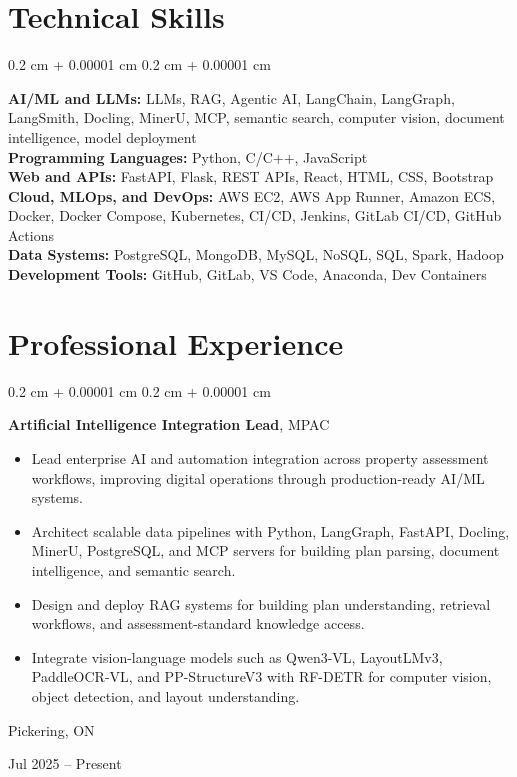 \documentclass[10pt, letterpaper]{article}
\newenvironment{highlights}{
    \begin{itemize}[
        topsep=0.10 cm,
        parsep=0.10 cm,
        partopsep=0pt,
        itemsep=0pt,
        leftmargin=0.4 cm + 10pt
    ]
}{
    \end{itemize}
} %
\newenvironment{onecolentry}{
    \begin{adjustwidth}{
        0.2 cm + 0.00001 cm
    }{
        0.2 cm + 0.00001 cm
    }
}{
    \end{adjustwidth}
} %
\newenvironment{twocolentry}[2][]{
    \onecolentry
    \def\secondColumn{#2}
    \begin{minipage}[t]{\dimexpr\linewidth-4.7cm\relax}
}{
    \end{minipage}\hfill%
    \begin{minipage}[t]{4.5cm}
        \raggedleft\secondColumn
    \end{minipage}
    \endonecolentry
} %
\let\hrefWithoutArrow\href
\renewcommand{\href}[2]{\hrefWithoutArrow{#1}{#2}}
\begin{document}
        \vspace{-0.2 cm}

\section{Technical Skills}
\begin{onecolentry}
\textbf{AI/ML and LLMs:} LLMs, RAG, Agentic AI, LangChain, LangGraph, LangSmith, Docling, MinerU, MCP, semantic search, computer vision, document intelligence, model deployment\\
\textbf{Programming Languages:} Python, C/C++, JavaScript\\
\textbf{Web and APIs:} FastAPI, Flask, REST APIs, React, HTML, CSS, Bootstrap\\
\textbf{Cloud, MLOps, and DevOps:} AWS EC2, AWS App Runner, Amazon ECS, Docker, Docker Compose, Kubernetes, CI/CD, Jenkins, GitLab CI/CD, GitHub Actions\\
\textbf{Data Systems:} PostgreSQL, MongoDB, MySQL, NoSQL, SQL, Spark, Hadoop\\
\textbf{Development Tools:} GitHub, GitLab, VS Code, Anaconda, Dev Containers
\end{onecolentry}

        
\vspace{-0.2 cm}
\section{Professional Experience}

\begin{twocolentry}{
    Pickering, ON 

    Jul 2025 – Present
}
    \textbf{Artificial Intelligence Integration Lead}, MPAC


\begin{highlights}
    \item Lead enterprise AI and automation integration across property assessment workflows, improving digital operations through production-ready AI/ML systems.
    \item Architect scalable data pipelines with Python, LangGraph, FastAPI, Docling, MinerU, PostgreSQL, and MCP servers for building plan parsing, document intelligence, and semantic search.
    \item Design and deploy RAG systems for building plan understanding, retrieval workflows, and assessment-standard knowledge access.
    \item Integrate vision-language models such as Qwen3-VL, LayoutLMv3, PaddleOCR-VL, and PP-StructureV3 with RF-DETR for computer vision, object detection, and layout understanding.
\end{highlights}



\end{twocolentry}
\end{document}
